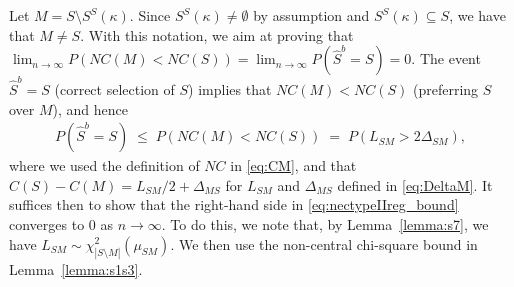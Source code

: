 \documentclass[bj,authoryear]{imsart}
\theoremstyle{plain}
\begin{document}
Let $M=S\setminus S^{S}(\kappa)$. Since $S^{S}(\kappa)\neq \emptyset$ by assumption and $S^S(\kappa)\subseteq S$, we have that $M\neq S$. With this notation, we aim at proving that $\lim_{n\to \infty}P(NC(M)<NC(S))=\lim_{n\to \infty}P(\hat S^b=S)=0$. The event $\hat{S}^b=S$ (correct selection of $S$) implies that $NC(M)< NC(S)$ (preferring $S$ over $M$), and hence 
\begin{align}\label{eq:nectypeIIreg_bound}
P(\hat{S}^b=S)\;\leq\; P\left( NC(M) < NC(S) \right)
\;=\; P(L_{SM}> 2\Delta_{SM}),
\end{align}
where we used the definition of $NC$ in
\eqref{eq:CM}, and that $C(S)-C(M)=L_{SM}/2 + \Delta_{MS}$ for $L_{SM}$ and $\Delta_{MS}$ defined in \eqref{eq:DeltaM}. It suffices then to show that the right-hand side in \eqref{eq:nectypeIIreg_bound} converges to 0 as $n \to \infty$.
To do this, we note that, by Lemma~\ref{lemma:s7}, we have $L_{SM}\sim \chi_{|S\setminus M|}^2(\mu_{SM})$. We then use the non-central chi-square bound in Lemma~\ref{lemma:s1s3}.
\end{document}
